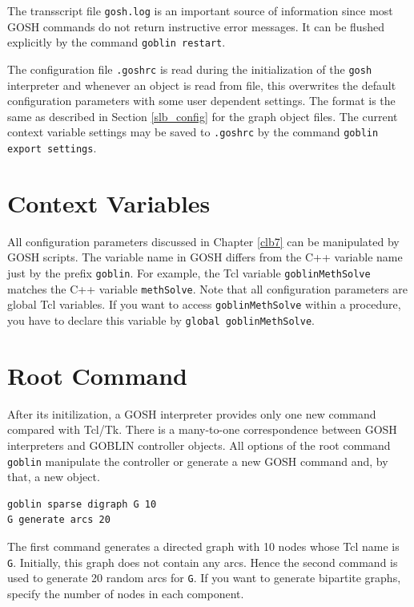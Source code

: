 \documentclass[a4paper,11pt,twoside]{book}
\begin{document}
\begin{multicols}{2}
The transscript file \verb/gosh.log/ is an important source of information
since most GOSH commands do not return instructive error messages. It can be
flushed explicitly by the command \verb/goblin restart/.

The configuration file \verb/.goshrc/ is read during the initialization of
the \verb/gosh/ interpreter and whenever an object is read from file, this
overwrites the default configuration parameters with some user dependent
settings. The format is the same as described in Section \ref{slb_config} for
the graph object files. The current context variable settings may be saved to
\verb/.goshrc/ by the command \verb/goblin export settings/.


\section{Context Variables}
All configuration parameters discussed in Chapter \ref{clb7} can be manipulated
by GOSH scripts. The variable name in GOSH differs from the C++ variable name
just by the prefix \verb/goblin/. For example, the Tcl variable
\verb/goblinMethSolve/ matches the C++ variable \verb/methSolve/. Note that
all configuration parameters are global Tcl variables. If you want to access
\verb/goblinMethSolve/ within a procedure, you have to declare this variable by
\verb/global goblinMethSolve/.


\end{multicols}
\section{Root Command}
After its initilization, a GOSH interpreter provides only one new command
compared with Tcl/Tk. There is a many-to-one correspondence between GOSH
interpreters and GOBLIN controller objects. All options of the root command
\verb/goblin/ manipulate the controller or generate a new GOSH command and, by
that, a new object.
\begin{mysample}
\begin{verbatim}
goblin sparse digraph G 10
G generate arcs 20
\end{verbatim}
\end{mysample}
The first command generates a directed graph with 10 nodes whose Tcl name is
\verb/G/. Initially, this graph does not contain any arcs. Hence the second
command is used to generate 20 random arcs for \verb/G/. If you want to generate
bipartite graphs, specify the number of nodes in each component.
\end{document}
